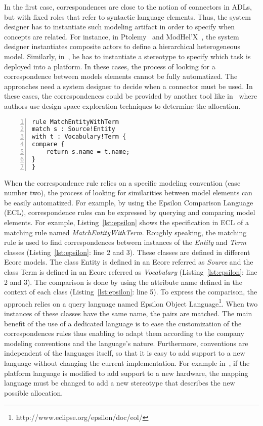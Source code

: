 In the first case, correspondences are close to the notion of connectors in ADLs, but with fixed roles that refer to syntactic language elements. Thus, the system designer has to instantiate such modeling artifact in order to specify when concepts are related. For instance, in Ptolemy~\cite{ptoleframebib} and ModHel'X~\cite{modhelxbib}, the system designer instantiates composite actors to define a hierarchical heterogeneous model. Similarly, in~\cite{dinatale}, he has to instantiate a stereotype to specify which task is deployed into a platform. In these cases, the process of looking for a correspondence between models elements cannot be fully automatized. The approaches need a system designer to decide when a connector must be used. In these cases, the correspondences could be provided by another tool like in~\cite{kofmanbib} where authors use design space exploration techniques to determine the allocation.%
	\begin{lstlisting}[language=epsilon,
	caption={Matching rule in the Epsilon Comparison Language},
	label={lst:epsilon}, 
	basicstyle=\scriptsize\ttfamily, backgroundcolor=\color{LGrey}, numbers=left, xleftmargin=2pt]
rule MatchEntityWithTerm
match s : Source!Entity
with t : Vocabulary!Term {
compare {
	return s.name = t.name;
}
}
\end{lstlisting}
	
When the correspondence rule relies on a specific modeling convention (case number two), the process of looking for similarities between model elements can be easily automatized. For example, by using the Epsilon Comparison Language (ECL), correspondence rules can be expressed by querying and comparing model elements. For example, Listing~\ref{lst:epsilon} shows the specification in ECL of a matching rule named \emph{MatchEntityWithTerm}. Roughly speaking, the matching rule is used to find correspondences between instances of the \emph{Entity} and \emph{Term} classes (Listing~\ref{lst:epsilon}: line 2 and 3). These classes are defined in different Ecore models. The class Entity is defined in an Ecore referred as \emph{Source} and the class Term is defined in an Ecore referred as \emph{Vocabulary} (Listing~\ref{lst:epsilon}: line 2 and 3). The comparison is done by using the attribute name defined in the context of each class (Listing~\ref{lst:epsilon}: line 5). To express the comparison, the approach relies on a query language named Epsilon Object Language\footnote{http://www.eclipse.org/epsilon/doc/eol/}. When two instances of these classes have the same name, the pairs are matched. The main benefit of the use of a dedicated language is to ease the customization of the correspondences rules thus enabling to adapt them according to the company modeling conventions and the language's nature. Furthermore, conventions are independent of the languages itself, so that it is easy to add support to a new language without changing the current implementation. For example in~\cite{dinatale}, if the platform language is modified to add support to a new hardware, the mapping language must be changed to add a new stereotype that describes the new possible allocation.

